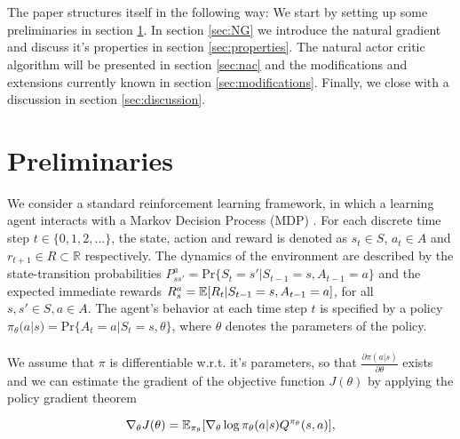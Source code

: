 \\\\
The paper structures itself in the following way: We start by setting up some preliminaries in section \ref{sec:preliminaries}. In section \ref{sec:NG} we introduce the natural gradient and discuss it's properties in section \ref{sec:properties}. The natural actor critic algorithm will be presented in section \ref{sec:nac} and the modifications and extensions currently known in section \ref{sec:modifications}. Finally, we close with a discussion in section \ref{sec:discussion}.


\section{Preliminaries}
\label{sec:preliminaries}

We consider a standard reinforcement learning framework, in which a learning agent interacts with a Markov Decision Process (MDP) \citep{howard1960dynamic, sutton2018reinforcement}. For each discrete time step $t \in \{0,1,2,...\}$, the state, action and reward is denoted as $s_t \in \mathit{S}$, $a_t \in A$ and $r_{t+1} \in \mathit{R} \subset \mathbb{R}$ respectively. The dynamics of the environment are described by the state-transition probabilities $P^a_{ss'} = \text{Pr}\{S_t = s' | S_{t-1} = s, A_{t-1} = a\}$ and the expected immediate rewards $R^a_s = \operatorname{\mathbb{E}}[R_t | S_{t-1} = s, A_{t-1} = a]$, for all $s, s' \in S, a \in A$. The agent's behavior at each time step $t$ is specified by a policy $\pi_{\theta}(a|s) = \text{Pr}\{A_t = a | S_{t} = s, \theta\}$, where $\theta$ denotes the parameters of the policy. 
\\\\
We assume that $\pi$ is differentiable w.r.t. it's parameters, so that $\tfrac{\partial\pi(a|s)}{\partial \theta}$ exists and we can estimate the gradient of the objective function $J(\theta)$ by applying the policy gradient theorem \citep{sutton2000policy}

\begin{equation}
\label{equ:policygradienttheorem}
\nabla_{\theta}J(\theta)=\operatorname{\mathbb{E}}_{\pi_{\theta}}[\nabla_{\theta}\log\pi_{\theta}(a|s) Q^{\pi_{\theta}}(s, a)],
\end{equation}

